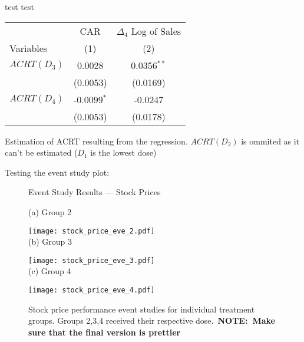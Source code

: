 \documentclass[12pt]{article}
\begin{document}
test test

\begin{table}[!htbp] \centering
  \label{}

  \begin{tabular}{lcc}
        \toprule
        \toprule
                                    & CAR           & $\Delta_4$ Log of Sales \\
        Variables                   & (1)           & (2)\\
        \midrule
        $ACRT(D_3)$                 & 0.0028         & 0.0356$^{**}$ \\
                                    & (0.0053)      & (0.0169)\\
        $ACRT(D_4)$                 & -0.0099$^{*}$  & -0.0247\\
                                    & (0.0053)      & (0.0178)\\
        \bottomrule
    \end{tabular}

    \begin{tablenotes}
        \footnotesize
    \item Estimation of ACRT resulting from the regression. $ACRT(D_2)$ is ommited as it can't be estimated ($D_1$ is the lowest dose)
    \end{tablenotes}

\end{table}



Testing the event study plot:
\newpage
\begin{figure}
    \caption{Event Study Results --- Stock Prices}
    \centering

    (a) Group 2
    
    \texttt{[image: stock\_price\_eve\_2.pdf]} \\
    
    (b) Group 3
    
    \texttt{[image: stock\_price\_eve\_3.pdf]} \\
    
    (c) Group 4
    
    \texttt{[image: stock\_price\_eve\_4.pdf]}
    
    \captionsetup{font=footnotesize}
    \caption*{Stock price performance event studies for individual treatment groups. Groups 2,3,4 received their respective dose.\ \textbf{NOTE:~Make sure that the final version is prettier}}
\end{figure}
\end{document}
